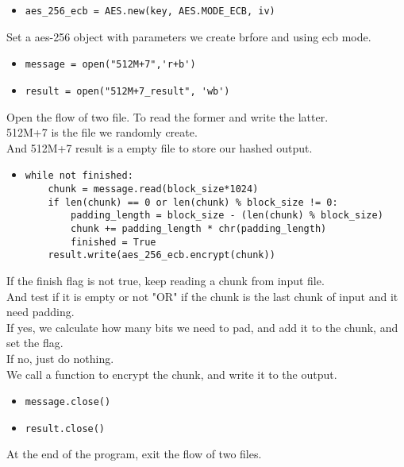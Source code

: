 \documentclass{article}
\begin{document}
\begin{itemize}
\item \verb|aes_256_ecb = AES.new(key, AES.MODE_ECB, iv)|
\end{itemize}

\noindent Set a aes-256 object with parameters we create brfore and using ecb mode.

\begin{itemize}
\item \verb|message = open("512M+7",'r+b')|
\item \verb|result = open("512M+7_result", 'wb')|
\end{itemize}
 
\noindent Open the flow of two file. To read the former and write the latter.\\
512M+7 is the file we randomly create.\\
And 512M+7 result is a empty file to store our hashed output.

\begin{itemize}
\item \begin{verbatim}while not finished:
    chunk = message.read(block_size*1024)
    if len(chunk) == 0 or len(chunk) % block_size != 0:
        padding_length = block_size - (len(chunk) % block_size)
        chunk += padding_length * chr(padding_length)
        finished = True
    result.write(aes_256_ecb.encrypt(chunk))
\end{verbatim}
\end{itemize}

\noindent If the finish flag is not true, keep reading a chunk from input file.\\
And test if it is empty or not "OR" if the chunk is the last chunk of input and it need padding.\\
If yes, we calculate how many bits we need to pad, and add it to the chunk, and set the flag. \\
If no, just do nothing.\\
We call a function to encrypt the chunk, and write it to the output.

\begin{itemize}
\item \verb|message.close()|
\item \verb|result.close()|
\end{itemize}

\noindent At the end of the program, exit the flow of two files.\\
\end{document}
